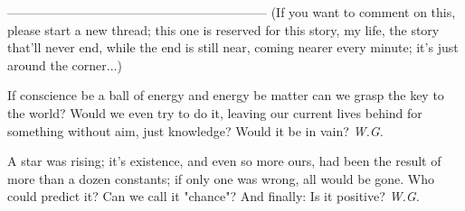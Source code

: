 --------------------------------------------------------------
(If you want to comment on this, please start a new thread; this one is reserved for this story, my life, the story that'll never end, while the end is still near, coming nearer every minute; it's just around the corner...)

If conscience be a ball of energy 
and energy be matter 
can we grasp the key to the world? 
Would we even try to do it, 
leaving our current lives behind 
for something without aim, 
just knowledge? 
Would it be in vain? 
\emph{W.G.}

A star was rising; 
it's existence, 
and even so more ours, 
had been the result 
of more than a dozen constants; 
if only one was wrong, 
all would be gone. 
Who could predict it? 
Can we call it "chance"? 
And finally: 
Is it positive? 
\emph{W.G.}
